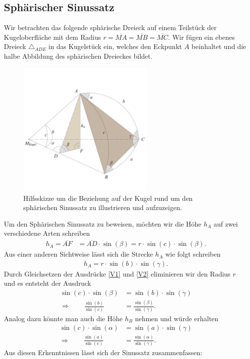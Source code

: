 \begin{refsection}
\subsection{Sphärischer Sinussatz}
Wir betrachten das folgende sphärische Dreieck auf einem Teilstück
der Kugeloberfläche mit dem Radius $r= \overline{MA} = \overline{MB}
= \overline{MC}$. Wir fügen ein ebenes Dreieck $\triangle_{ADE}$
in das Kugelstück ein, welches den Eckpunkt $A$ beinhaltet und die
halbe Abbildung des sphärischen Dreieckes bildet.

\begin{figure}[hbtp]
\centering
\includegraphics[width=0.6\textwidth]{kugel/Sinussatz.jpg}
\caption{Hilfsskizze um die Beziehung auf der Kugel rund um den
sphärischen Sinussatz zu illustrieren und aufzuzeigen.}
\end{figure}

Um den Sphärischen Sinussatz zu beweisen, möchten wir die Höhe
$h_{A}$ auf zwei verschiedene Arten schreiben
\begin{align}
h_{A} = \overline{AF} &= \overline{AD} \cdot \sin(\beta) = r \cdot \sin(c) \cdot \sin(\beta).  
\label {V1}
\end{align}
Aus einer anderen Sichtweise lässt sich die Strecke $h_{A}$ wie folgt schreiben
\begin{align}
h_{A} = r \cdot \sin(b) \cdot \sin(\gamma).  
\label {V2}
\end{align}
Durch Gleichsetzen der Ausdrücke \eqref{V1} und \eqref{V2} eliminieren
wir den Radius $r$ und es entsteht der Ausdruck
\begin{align*}
\sin(c) \cdot \sin(\beta) &= \sin(b) \cdot \sin(\gamma) \\
\Rightarrow \quad \quad
\frac{\sin (b)}{\sin (c)} &= \frac{\sin (\beta)}{\sin (\gamma)}.
\end{align*}
Analog dazu könnte man auch die Höhe $h_{B}$ nehmen und würde erhalten
\begin{align*}
\sin(c) \cdot \sin(\alpha) &= \sin(a) \cdot \sin(\gamma) \\
\Rightarrow \quad \quad
\frac{\sin (a)}{\sin (c)} &= \frac{\sin (\alpha)}{\sin (\gamma)}.
\end{align*}
Aus diesen Erkenntnissen lässt sich der Sinussatz zusammenfassen:


\end{refsection}
